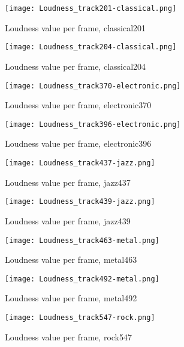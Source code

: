\documentclass{article} %
\begin{document}
\begin{figure}[h]
\centering
\texttt{[image: Loudness\_track201-classical.png]}
\caption{Loudness value per frame, classical201}
\label{fig:loudness_201}
\end{figure}

\begin{figure}
\centering
\vspace{-400em}
\texttt{[image: Loudness\_track204-classical.png]}
\caption{Loudness value per frame, classical204}
\label{fig:loudness_204}
\end{figure}

\begin{figure}
\centering
\texttt{[image: Loudness\_track370-electronic.png]}
\caption{Loudness value per frame, electronic370}
\label{fig:loudness_370}
\end{figure}

\begin{figure}
\centering
\texttt{[image: Loudness\_track396-electronic.png]}
\caption{Loudness value per frame, electronic396}
\label{fig:loudness_396}
\end{figure}

\begin{figure}
\centering
\texttt{[image: Loudness\_track437-jazz.png]}
\caption{Loudness value per frame, jazz437}
\label{fig:loudness_437}
\end{figure}

\begin{figure}
\centering
\texttt{[image: Loudness\_track439-jazz.png]}
\caption{Loudness value per frame, jazz439}
\label{fig:loudness_439}
\end{figure}

\begin{figure}
\centering
\texttt{[image: Loudness\_track463-metal.png]}
\caption{Loudness value per frame, metal463}
\label{fig:loudness_463}
\end{figure}


\begin{figure}
\centering
\texttt{[image: Loudness\_track492-metal.png]}
\caption{Loudness value per frame, metal492}
\label{fig:loudness_492}
\end{figure}


\begin{figure}
\centering
\texttt{[image: Loudness\_track547-rock.png]}
\caption{Loudness value per frame, rock547}
\label{fig:loudness_547}
\end{figure}
\end{document}
